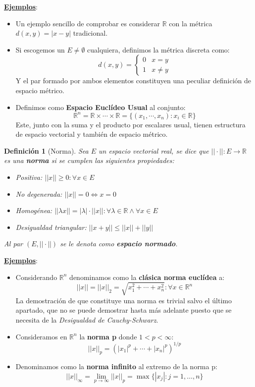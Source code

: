 \documentclass[10pt,a4paper,openright]{book}
\theoremstyle{break}
\newtheorem*{defi}{Definición}
\begin{document}
\underline{\textbf{Ejemplos}}:
\begin{itemize}
\item Un ejemplo sencillo de comprobar es considerar $\mathbb R$ con la métrica $d(x,y) = |x-y|$ tradicional.

\item Si escogemos un $E\neq \emptyset$ cualquiera, definimos la métrica discreta como:
$$d(x,y) = \begin{cases} 0 & x= y \\ 1 & x\neq y \end{cases}$$
Y el par formado por ambos elementos constituyen una peculiar definición de espacio métrico.	

\item Definimos como \textbf{Espacio Euclídeo Usual} al conjunto:
$$\mathbb R ^n = \mathbb R\times \cdots \times \mathbb R = \{(x_1, \cdots, x_n): x_i\in \mathbb R\}$$
Este, junto con la suma y el producto por escalares usual, tienen estructura de espacio vectorial y también de espacio métrico.
\end{itemize}

\begin{defi}[Norma]
Sea $E$ un espacio vectorial real, se dice que $||\cdot||: E \rightarrow \mathbb R$ es una \textbf{norma} si se cumplen las siguientes propiedades:
\begin{itemize}
\item Positiva: $||x||\geq 0: \forall x \in E$
\item No degenerada: $||x|| = 0 \Leftrightarrow x = 0$
\item Homogénea: $||\lambda x|| = |\lambda| \cdot ||x||: \forall \lambda \in \mathbb R \wedge \forall x \in E$
\item Desigualdad triangular: $||x+y||\leq ||x|| + ||y||$
\end{itemize}
Al par $(E,||\cdot||)$ se le denota como \textbf{espacio normado}.
\end{defi}

\underline{\textbf{Ejemplos}}:
\begin{itemize}
\item Considerando $\mathbb R^n$ denominamos como la \textbf{clásica norma euclídea} a:
$$||x|| = ||x||_2 = \sqrt{x_1^2+\cdots + x_n^2} : \forall x \in \mathbb R^n $$
La demostración de que constituye una norma es trivial salvo el último apartado, que no se puede demostrar hasta más adelante puesto que se necesita de la \textit{Desigualdad de Cauchy-Schwarz}.
\item Consideramos en $\mathbb R^n$ la \textbf{norma p} donde $1<p<\infty$:
$$||x||_p = \left(|x_1|^p + \cdots + |x_n|^p\right)^{1/p}$$
\item Denominamos como la \textbf{norma infinito} al extremo de la norma p:
$$||x||_\infty = \lim_{p\rightarrow\infty} ||x||_p = \max \{|x_j| : j = 1,\ldots, n\}$$
\end{itemize}
\end{document}
